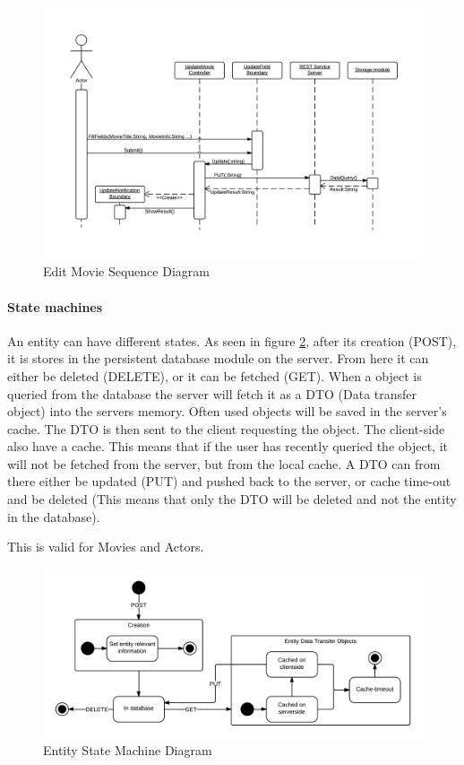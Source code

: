 \begin{figure}[H]
\includegraphics[width=\linewidth]{img/RAD/EditMovieSequenceDiagram.png}
\caption{Edit Movie Sequence Diagram}
\label{fig:Edit Movie Sequence Diagram}
\end{figure}

\paragraph{State machines}
An entity can have different states. As seen in figure \ref{fig:Entity State Machine Diagram}, after its creation (POST), it is stores in the persistent database module on the server. From here it can either be deleted (DELETE), or it can be fetched (GET). When a object is queried from the database the server will fetch it as a DTO (Data transfer object) into the servers memory. Often used objects will be saved in the server's cache. The DTO is then sent to the client requesting the object. The client-side also have a cache. This means that if the user has recently queried the object, it will not be fetched from the server, but from the local cache. A DTO can from there either be updated (PUT) and pushed back to the server, or cache time-out and be deleted (This means that only the DTO will be deleted and not the entity in the database).

This is valid for Movies and Actors.

\begin{figure}[H]
\includegraphics[width=\linewidth]{img/RAD/EntityStateMachineDiagram.png}
\caption{Entity State Machine Diagram}
\label{fig:Entity State Machine Diagram}
\end{figure}
\newpage

